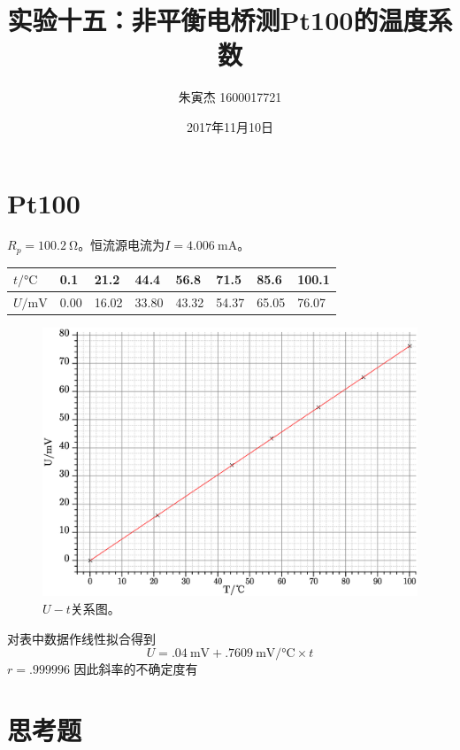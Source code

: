 \documentclass[UTF8]{ctexart}
\title{实验十五：非平衡电桥测Pt100的温度系数}
\author{朱寅杰 1600017721}
\date{2017年11月10日}
\begin{document}
\maketitle

\section{Pt100}
$R_p=\SI{100.2}{\ohm}$。恒流源电流为$I=\SI{4.006}{\milli\ampere}$。
\begin{center}
\begin{tabu} to \linewidth {X[c]|X[c] X[c] X[c] X[c] X[c] X[c] X[c]}
\hline
$t/\si{\celsius}$	&0.1	&21.2	&44.4	&56.8	&71.5	&85.6	&100.1
\\
\hline
$U/\si{\milli\volt}$	&0.00	&16.02	&33.80	&43.32	&54.37	&65.05	&76.07
\\
\hline
\end{tabu}
\end{center}

\begin{figure}[h]
  \includegraphics[width=\linewidth,keepaspectratio=true]{Pt100.eps}
  \caption{$U-t$关系图。}
\end{figure}
对表中数据作线性拟合得到
\begin{equation}
  U=\SI{.04}{\milli\volt}+\SI{.7609}{\milli\volt\per\celsius}\times t
\end{equation}
$r=\num{.999996}$
因此斜率的不确定度有
\section{思考题}
\end{document}
